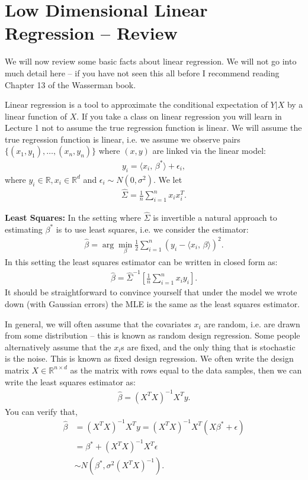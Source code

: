 \documentclass[twoside,12pt]{article}
\newcommand{\inprod}[2]{\ensuremath{\langle #1 , \, #2 \rangle}}
\begin{document}
\section{Low Dimensional Linear Regression -- Review} 
We will now review some basic facts about linear regression. We will not go into much detail here -- if you have not seen this all before I recommend reading Chapter 13 of the Wasserman book. 

Linear regression is a tool to approximate the conditional expectation of $Y|X$ by a linear function of $X$. If you take a class on linear regression you will learn in Lecture 1 not to assume the true regression function is linear. We will assume the true regression function is linear, i.e. we assume we observe pairs $\{(x_1,y_1), \ldots,(x_n,y_n)\}$ where $(x,y)$ are linked via the linear model:
\begin{align*}
y_i = \inprod{x_i}{\beta^*} + \epsilon_i,
\end{align*}
where $y_i \in \mathbb{R}, x_i \in \mathbb{R}^d$ and $\epsilon_i \sim N(0,\sigma^2)$. We let 
\begin{align*}
\widehat{\Sigma} = \frac{1}{n} \sum_{i=1}^n x_i x_i^T. 
\end{align*}

{\bf Least Squares: } In the setting where $\widehat{\Sigma}$ is invertible a natural approach to estimating $\beta^*$ is to use least squares, i.e. we consider the estimator:
\begin{align*}
\widehat{\beta} = \arg \min_{\beta} \frac{1}{2} \sum_{i=1}^n (y_i - \inprod{x_i}{\beta})^2.
\end{align*}
In this setting the least squares estimator can be written in closed form as:
\begin{align*}
\widehat{\beta} = \widehat{\Sigma}^{-1} \left[ \frac{1}{n} \sum_{i=1}^n x_i y_i\right]. 
\end{align*}
It should be straightforward to convince yourself that under the model we wrote down (with Gaussian errors) the MLE is the same as the least squares estimator.

In general, we will often assume that the covariates $x_i$ are random, i.e. are drawn from some distribution -- this is known as random design regression. Some people alternatively assume that the $x_i$s are fixed, and the only thing that is stochastic is the noise. This is known as fixed design regression. We often write the design matrix $X \in \mathbb{R}^{n \times d}$ as the matrix with rows equal to the data samples, then we can write the least squares estimator as:
\begin{align*}
\widehat{\beta} = (X^T X)^{-1} X^T y.
\end{align*}
You can verify that,
\begin{align*}
\widehat{\beta} &= (X^T X)^{-1} X^T y = (X^T X)^{-1} X^T (X \beta^* + \epsilon) \\
&= \beta^* +  (X^T X)^{-1} X^T \epsilon \\
&\sim N(\beta^*, \sigma^2 (X^T X)^{-1}).
\end{align*}
\end{document}
